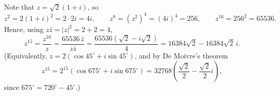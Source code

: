 Note that $z=\sqrt2(1+i)$, so
\[z^2=2(1+i)^2=2\cdot 2i=4i,\qquad z^8=\left(z^2\right)^4=(4i)^4=256,\qquad z^{16}=256^2=65536 .\]
Hence, using $z\bar z=|z|^2=2+2=4$,
\[z^{15}=\dfrac{z^{16}}{z}=\dfrac{65536\,\bar z}{z\bar z}=\dfrac{65536\left(\sqrt2-i\sqrt2\right)}{4}=\boxed{16384\sqrt2-16384\sqrt2\,i}.\]
(Equivalently, $z=2\left(\cos45^\circ+i\sin45^\circ\right)$, and by De Moivre's theorem
\[z^{15}=2^{15}\left(\cos675^\circ+i\sin675^\circ\right)=32768\left(\dfrac{\sqrt2}{2}-\dfrac{\sqrt2}{2}i\right),\]
since $675^\circ=720^\circ-45^\circ$.)
